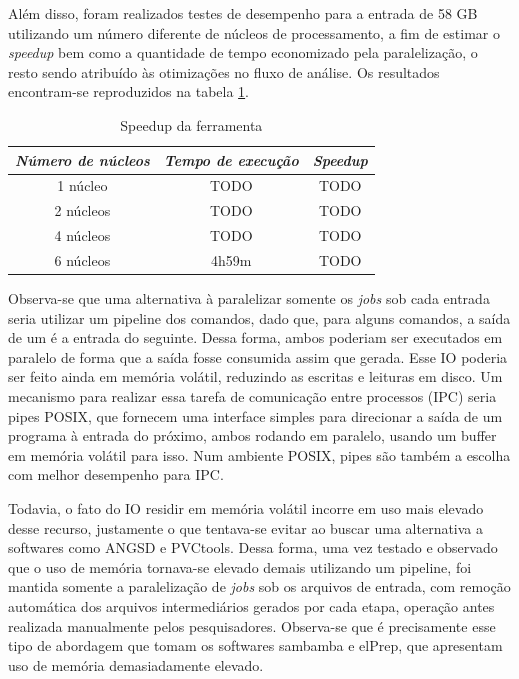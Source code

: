 \documentclass[cic,tc]{iiufrgs}
\begin{document}
Além disso, foram realizados testes de desempenho para a entrada de 58 GB
utilizando um número diferente de núcleos de processamento, a fim de estimar o
\textit{speedup} bem como a quantidade de tempo economizado pela paralelização,
o resto sendo atribuído às otimizações no fluxo de análise. Os resultados
encontram-se reproduzidos na tabela \ref{tbl:speedup}.

\begin{table}[h]
    \caption{Speedup da ferramenta}
    \centering
        \begin{tabular}{c|c|c}
          \hline
          \textit{Número de núcleos}  &   \textit{Tempo de execução}  & \textit{Speedup} \\
          \hline
          \hline
          1 núcleo & TODO & TODO \\
          2 núcleos & TODO & TODO \\
          4 núcleos & TODO & TODO \\
          6 núcleos & 4h59m & TODO \\
          \hline
        \end{tabular}
    \label{tbl:speedup}
\end{table}

Observa-se que uma alternativa à paralelizar somente os \textit{jobs} sob cada
entrada seria utilizar um pipeline dos comandos, dado que, para alguns
comandos, a saída de um é a entrada do seguinte. Dessa forma, ambos poderiam
ser executados em paralelo de forma que a saída fosse consumida assim que
gerada. Esse IO poderia ser feito ainda em memória volátil, reduzindo as
escritas e leituras em disco. Um mecanismo para realizar essa tarefa de
comunicação entre processos (IPC) seria pipes POSIX, que fornecem uma interface
simples para direcionar a saída de um programa à entrada do próximo, ambos
rodando em paralelo, usando um buffer em memória volátil para
isso.\cite{immich2003performance} Num ambiente POSIX, pipes são também a
escolha com melhor desempenho para IPC.\cite{immich2003performance}

Todavia, o fato do IO residir em memória volátil incorre em uso mais elevado
desse recurso, justamente o que tentava-se evitar ao buscar uma alternativa a
softwares como ANGSD e PVCtools. Dessa forma, uma vez testado e observado que o
uso de memória tornava-se elevado demais utilizando um pipeline, foi mantida
somente a paralelização de \textit{jobs} sob os arquivos de entrada, com
remoção automática dos arquivos intermediários gerados por cada etapa, operação
antes realizada manualmente pelos pesquisadores. Observa-se que é precisamente
esse tipo de abordagem que tomam os softwares sambamba e elPrep, que apresentam
uso de memória demasiadamente elevado. 
\end{document}
